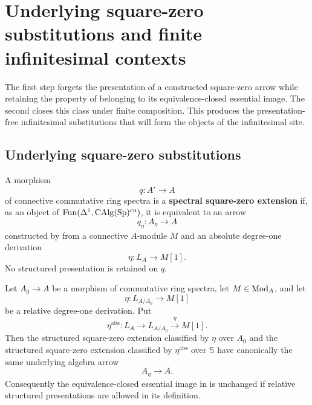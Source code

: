 \section{Underlying square-zero substitutions and finite infinitesimal contexts}
\label{sec:underlying-square-zero-finite}

The first step forgets the presentation of a constructed square-zero arrow
while retaining the property of belonging to its equivalence-closed essential
image. The second closes this class under finite composition. This produces
the presentation-free infinitesimal substitutions that will form the objects
of the infinitesimal site.

\subsection{Underlying square-zero substitutions}

\begin{definition}
\label{def:underlying-spectral-square-zero-extension}
A morphism
\[
    q:A'\longrightarrow A
\]
of connective commutative ring spectra is a \textbf{spectral square-zero
extension} if, as an object of
\(\operatorname{Fun}(\Delta^1,\operatorname{CAlg}(\operatorname{Sp})^{\mathrm{cn}})\), it is equivalent to an arrow
\[
    q_\eta:A_\eta\longrightarrow A
\]
constructed by  from a connective
\(A\)-module \(M\) and an absolute degree-one derivation
\[
    \eta:L_A\longrightarrow M[1].
\]
No structured presentation is retained on \(q\).
\end{definition}

\begin{lemma}
\label{lem:relative-absolute-square-zero-underlying}
Let \(A_0\to A\) be a morphism of commutative ring spectra, let
\(M\in\operatorname{Mod}_A\), and let
\[
    \eta:L_{A/A_0}\longrightarrow M[1]
\]
be a relative degree-one derivation. Put
\[
    \eta^{\mathrm{abs}}:
    L_A\longrightarrow L_{A/A_0}\xrightarrow{\eta}M[1].
\]
Then the structured square-zero extension classified by \(\eta\) over
\(A_0\) and the structured square-zero extension classified by
\(\eta^{\mathrm{abs}}\) over \(\mathbb S\) have canonically the same
underlying algebra arrow
\[
    A_\eta\longrightarrow A.
\]
Consequently the equivalence-closed essential image in
 is unchanged if relative
structured presentations are allowed in its definition.
\end{lemma}

